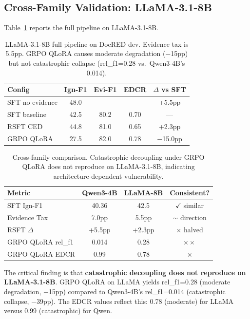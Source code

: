 \documentclass[11pt,a4paper]{article}
\newcommand{\edcr}{EDCR}
\newcommand{\ced}{CED}
\begin{document}
\subsection{Cross-Family Validation: LLaMA-3.1-8B}
\label{sec:llama}

Table~\ref{tab:llama} reports the full pipeline on LLaMA-3.1-8B.

\begin{table}[t]
\centering
\small
\begin{tabular}{lcccc}
\toprule
\textbf{Config} & \textbf{Ign-F1} & \textbf{Evi-F1} & \textbf{EDCR} & \textbf{$\Delta$ vs SFT} \\
\midrule
SFT no-evidence & 48.0 & --- & --- & +5.5pp \\
SFT baseline & 42.5 & 80.2 & 0.70 & --- \\
RSFT \ced{} & 44.8 & 81.0 & 0.65 & +2.3pp \\
GRPO QLoRA & 27.5 & 82.0 & 0.78 & $-$15.0pp \\
\bottomrule
\end{tabular}
\caption{LLaMA-3.1-8B full pipeline on DocRED dev. Evidence tax is 5.5pp. GRPO QLoRA causes moderate degradation ($-$15pp) but not catastrophic collapse (rel\_f1=0.28 vs.\ Qwen3-4B's 0.014).}
\label{tab:llama}
\end{table}

\begin{table}[t]
\centering
\small
\begin{tabular}{lccc}
\toprule
\textbf{Metric} & \textbf{Qwen3-4B} & \textbf{LLaMA-8B} & \textbf{Consistent?} \\
\midrule
SFT Ign-F1 & 40.36 & 42.5 & $\checkmark$ similar \\
Evidence Tax & 7.0pp & 5.5pp & $\sim$ direction \\
RSFT $\Delta$ & +5.5pp & +2.3pp & $\times$ halved \\
GRPO QLoRA rel\_f1 & 0.014 & 0.28 & $\times\times$ \\
GRPO QLoRA \edcr{} & 0.99 & 0.78 & $\times$ \\
\bottomrule
\end{tabular}
\caption{Cross-family comparison. Catastrophic decoupling under GRPO QLoRA does not reproduce on LLaMA-3.1-8B, indicating architecture-dependent vulnerability.}
\label{tab:cross_family}
\end{table}

The critical finding is that \textbf{catastrophic decoupling does not reproduce on LLaMA-3.1-8B}.
GRPO QLoRA on LLaMA yields rel\_f1=0.28 (moderate degradation, $-$15pp) compared to Qwen3-4B's rel\_f1=0.014 (catastrophic collapse, $-$39pp).
The \edcr{} values reflect this: 0.78 (moderate) for LLaMA versus 0.99 (catastrophic) for Qwen.
\end{document}
